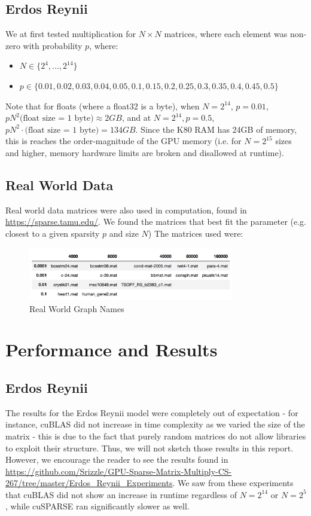 \documentclass[12pt]{article}
\begin{document}
\subsection{Erdos Reynii}
We at first tested multiplication for $N \times N$ matrices, where each element was non-zero with probability $p$, where: 
\begin{itemize} \item $N \in \{2^{4},...,2^{14} \}$ \item $p \in \{0.01, 0.02, 0.03, 0.04, 0.05, 0.1, 0.15, 0.2, 0.25, 0.3, 0.35, 0.4, 0.45, 0.5\}$
\end{itemize}
Note that for floats (where a float32 is a byte), when $N = 2^{14}$, $p = 0.01$, $pN^{2} \text{(float size = 1 byte)} \approx 2 GB$, and at $N = 2^{14}, p = 0.5$, $pN^{2} \cdot \text{(float size = 1 byte)} = 134 GB$. Since the K80 RAM has 24GB of memory, this is reaches the order-magnitude of the GPU memory (i.e. for $N = 2^{15}$ sizes and higher, memory hardware limits are broken and disallowed at runtime). 



\subsection{Real World Data}
Real world data matrices were also used in computation, found in \url{https://sparse.tamu.edu/}. We found the matrices that best fit the parameter (e.g. closest to a given sparsity $p$ and size $N$) The matrices used were: 
\begin{figure}[h]
  \caption{Real World Graph Names}
  \centering 
  \includegraphics[width = 0.8\textwidth]{matrix_names.png}
\end{figure}

\newpage 

\section{Performance and Results}


\subsection{Erdos Reynii}
The results for the Erdos Reynii model were completely out of expectation - for instance, cuBLAS did not increase in time complexity as we varied the size of the matrix - this is due to the fact that purely random matrices do not allow libraries to exploit their structure. Thus, we will not sketch those results in this report. However, we encourage the reader to see the results found in \url{https://github.com/Srizzle/GPU-Sparse-Matrix-Multiply-CS-267/tree/master/Erdos_Reynii_Experiments}. We saw from these experiments that cuBLAS did not show an increase in runtime regardless of $N = 2^{14}$ or $N = 2^{5}$, while cuSPARSE ran significantly slower as well. 
\end{document}

